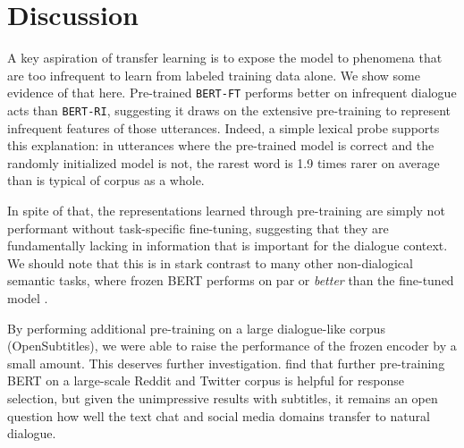 \documentclass[11pt,a4paper]{article}
\begin{document}



\section{Discussion} 

A key aspiration of transfer learning is to expose the model to 
phenomena that are too infrequent to learn from labeled training data alone.
We show some evidence of that here.
Pre-trained \texttt{BERT-FT} performs better on infrequent dialogue acts than \texttt{BERT-RI}, 
suggesting it draws on the extensive pre-training to represent infrequent features of those utterances.
Indeed, a simple lexical probe supports this explanation: in utterances where the pre-trained model is correct and the randomly initialized model is not, the rarest word is 1.9 times rarer on average than is typical of corpus as a whole.

In spite of that, the representations learned through pre-training are simply not performant without
task-specific fine-tuning, suggesting that they are fundamentally lacking in information that is 
important for the dialogue context.
We should note that this is in stark contrast to many other non-dialogical semantic tasks,
where frozen BERT performs on par or \emph{better} than the fine-tuned model \citep{petersTuneNotTune2019}.

By performing additional pre-training on a large dialogue-like corpus (OpenSubtitles),
we were able to raise the performance of the frozen encoder by a small amount.
This deserves further investigation. 
\citet{baoPLATOPretrainedDialogue2019} find that further pre-training BERT on a large-scale Reddit and Twitter corpus is helpful for response selection, but given the unimpressive results with subtitles, it remains an open question how well the text chat and social media domains transfer to natural dialogue.

\end{document}
